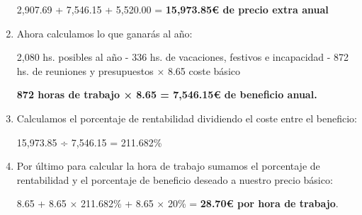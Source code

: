 \begin{enumerate}
2,907.69 + 7,546.15 + 5,520.00 = \textbf{15,973.85€ de precio extra anual}
\item Ahora calculamos lo que ganarás al año:

2,080 hs. posibles al año - 336 hs. de vacaciones, festivos e incapacidad - 872 hs. de reuniones y presupuestos × 8.65 coste básico

\textbf{872 horas de trabajo × 8.65 = 7,546.15€ de beneficio anual.}
\item Calculamos el porcentaje de rentabilidad dividiendo el coste entre el beneficio:

15,973.85 ÷ 7,546.15 = 211.682\%

\item Por último para calcular la hora de trabajo sumamos el porcentaje de rentabilidad y el porcentaje de beneficio deseado a nuestro precio básico:

8.65 + 8.65 × 211.682\% + 8.65 × 20\% = \textbf{28.70€ por hora de trabajo}.
\end{enumerate}















